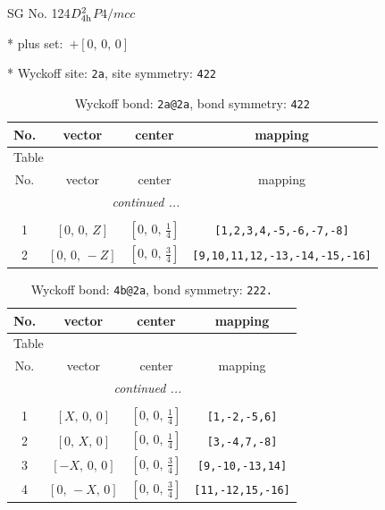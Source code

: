 \documentclass[fleqn,8pt]{jsarticle}
\begin{document}
\setcounter{MaxMatrixCols}{32}

\renewcommand{\tablename}{Table~}
\renewcommand{\figurename}{Figure~}
\begin{center}
\LARGE
SG No. 124\quad$D_{\rm 4h}^{2}$\quad$P4/mcc$\quad[ tetragonal ]
\end{center}

* plus set:\,\,\,$+\left[ 0,\, 0,\, 0 \right]$


* Wyckoff site: {\tt 2a}, site symmetry: {\tt 422}
\renewcommand{\arraystretch}{1.2}
\begin{longtable}{cccc}
\caption{Wyckoff bond: {\tt 2a@2a}, bond symmetry: {\tt 422}}
 \\
 \hline \hline
No. & vector & center & mapping \\ \hline \endfirsthead

\multicolumn{3}{l}{\tablename\ \thetable{}} \\
 \hline \hline
No. & vector & center & mapping \\ \hline \endhead

 \hline \hline
\multicolumn{3}{r}{\footnotesize\it continued ...} \\ \endfoot

 \hline \hline
\multicolumn{3}{r}{} \\ \endlastfoot

1 & $\left[ 0,\, 0,\, Z \right]$ & $\left[ 0,\, 0,\, \frac{1}{4} \right]$ & {\tt [1,2,3,4,-5,-6,-7,-8]} \\ \hline
2 & $\left[ 0,\, 0,\, - Z \right]$ & $\left[ 0,\, 0,\, \frac{3}{4} \right]$ & {\tt [9,10,11,12,-13,-14,-15,-16]} \\
\end{longtable}
\renewcommand{\arraystretch}{1.2}
\begin{longtable}{cccc}
\caption{Wyckoff bond: {\tt 4b@2a}, bond symmetry: {\tt 222.}}
 \\
 \hline \hline
No. & vector & center & mapping \\ \hline \endfirsthead

\multicolumn{3}{l}{\tablename\ \thetable{}} \\
 \hline \hline
No. & vector & center & mapping \\ \hline \endhead

 \hline \hline
\multicolumn{3}{r}{\footnotesize\it continued ...} \\ \endfoot

 \hline \hline
\multicolumn{3}{r}{} \\ \endlastfoot

1 & $\left[ X,\, 0,\, 0 \right]$ & $\left[ 0,\, 0,\, \frac{1}{4} \right]$ & {\tt [1,-2,-5,6]} \\ \hline
2 & $\left[ 0,\, X,\, 0 \right]$ & $\left[ 0,\, 0,\, \frac{1}{4} \right]$ & {\tt [3,-4,7,-8]} \\ \hline
3 & $\left[ - X,\, 0,\, 0 \right]$ & $\left[ 0,\, 0,\, \frac{3}{4} \right]$ & {\tt [9,-10,-13,14]} \\ \hline
4 & $\left[ 0,\, - X,\, 0 \right]$ & $\left[ 0,\, 0,\, \frac{3}{4} \right]$ & {\tt [11,-12,15,-16]} \\
\end{longtable}
\end{document}
